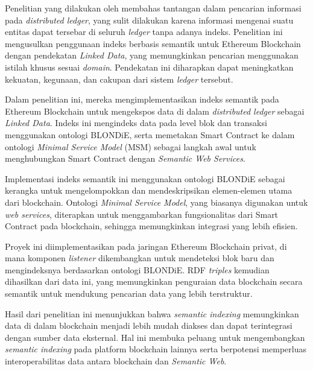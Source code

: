 Penelitian yang dilakukan oleh \parencite{third2017linked} membahas tantangan dalam pencarian informasi pada \textit{distributed ledger}, yang sulit dilakukan karena informasi mengenai suatu entitas dapat tersebar di seluruh \textit{ledger} tanpa adanya indeks. Penelitian ini mengusulkan penggunaan indeks berbasis semantik untuk Ethereum Blockchain dengan pendekatan \textit{Linked Data}, yang memungkinkan pencarian menggunakan istilah khusus sesuai \textit{domain}. Pendekatan ini diharapkan dapat meningkatkan kekuatan, kegunaan, dan cakupan dari sistem \textit{ledger} tersebut.

Dalam penelitian ini, mereka mengimplementasikan indeks semantik pada Ethereum Blockchain untuk mengekspos data di dalam \textit{distributed ledger} sebagai \textit{Linked Data}. Indeks ini mengindeks data pada level blok dan transaksi menggunakan ontologi BLONDiE, serta memetakan Smart Contract ke dalam ontologi \textit{Minimal Service Model} (MSM) sebagai langkah awal untuk menghubungkan Smart Contract dengan \textit{Semantic Web Services}.

Implementasi indeks semantik ini menggunakan ontologi BLONDiE sebagai kerangka untuk mengelompokkan dan mendeskripsikan elemen-elemen utama dari blockchain. Ontologi \textit{Minimal Service Model}, yang biasanya digunakan untuk \textit{web services}, diterapkan untuk menggambarkan fungsionalitas dari Smart Contract pada blockchain, sehingga memungkinkan integrasi yang lebih efisien.

Proyek ini diimplementasikan pada jaringan Ethereum Blockchain privat, di mana komponen \textit{listener} dikembangkan untuk mendeteksi blok baru dan mengindeksnya berdasarkan ontologi BLONDiE. RDF \textit{triples} kemudian dihasilkan dari data ini, yang memungkinkan penguraian data blockchain secara semantik untuk mendukung pencarian data yang lebih terstruktur.

Hasil dari penelitian ini menunjukkan bahwa \textit{semantic indexing} memungkinkan data di dalam blockchain menjadi lebih mudah diakses dan dapat terintegrasi dengan sumber data eksternal. Hal ini membuka peluang untuk mengembangkan \textit{semantic indexing} pada platform blockchain lainnya serta berpotensi memperluas interoperabilitas data antara blockchain dan \textit{Semantic Web}.
